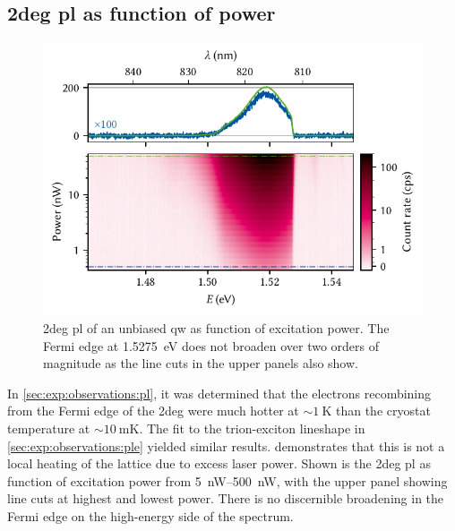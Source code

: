 \subsection{\texorpdfstring{\acrshort{2deg}}{2DEG} \texorpdfstring{\acrshort{pl}}{PL} as function of power}\label{subsec:app:exp:observations:meas:2deg}
\begin{figure}
    \centering
    \includegraphics{img/pdf/experiment/2deg_pl_power_dependence}
    \caption[
        \protect\newline
    ]{
        \Gls{2deg} \gls{pl} of an unbiased \gls{qw} as function of excitation power.
        The Fermi edge at \qty{1.5275}{\electronvolt} does not broaden over two orders of magnitude as the line cuts in the upper panels also show.
    }
    \label{fig:app:exp:observations:2deg_pl_power_dependence}
\end{figure}

In \cref{sec:exp:observations:pl}, it was determined that the electrons recombining from the Fermi edge of the \gls{2deg} were much hotter at $\sim\qty{1}{\kelvin}$ than the cryostat temperature at $\sim\qty{10}{\milli\kelvin}$.
The fit to the trion-exciton lineshape in \cref{sec:exp:observations:ple} yielded similar results.
 demonstrates that this is not a local heating of the lattice due to excess laser power.
Shown is the \gls{2deg} \gls{pl} as function of excitation power from \qtyrange{5}{500}{\nano\watt}, with the upper panel showing line cuts at highest and lowest power.
There is no discernible broadening in the Fermi edge on the high-energy side of the spectrum.
